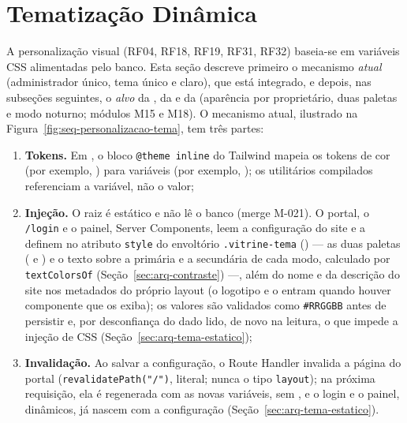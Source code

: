 
\section{Tematização Dinâmica}\label{sec:arq-tema}

A personalização visual (RF04, RF18, RF19, RF31, RF32) baseia-se em variáveis CSS alimentadas pelo banco. Esta seção descreve primeiro o mecanismo \emph{atual} (administrador único, tema único e claro), que está integrado, e depois, nas subseções seguintes, o \emph{alvo} da , da  e da  (aparência por proprietário, duas paletas e modo noturno; módulos M15 e M18). O mecanismo atual, ilustrado na Figura~\ref{fig:seq-personalizacao-tema}, tem três partes:

\begin{enumerate}
  \item \textbf{Tokens.} Em , o bloco \texttt{@theme inline} do Tailwind mapeia os tokens de cor (por exemplo, ) para variáveis (por exemplo, ); os utilitários compilados referenciam a variável, não o valor;
  \item \textbf{Injeção.} O  raiz é estático e não lê o banco (merge M-021). O portal, o \texttt{/login} e o painel, Server Components, leem a configuração do site e a definem no atributo \texttt{style} do envoltório \texttt{.vitrine-tema} () --- as duas paletas ( e ) e o texto sobre a primária e a secundária de cada modo, calculado por \texttt{textColorsOf} (Seção~\ref{sec:arq-contraste}) ---, além do nome e da descrição do site nos metadados do próprio layout (o logotipo e o  entram quando houver componente que os exiba); os valores são validados como \texttt{\#RRGGBB} antes de persistir e, por desconfiança do dado lido, de novo na leitura, o que impede a injeção de CSS (Seção~\ref{sec:arq-tema-estatico});
  \item \textbf{Invalidação.} Ao salvar a configuração, o Route Handler invalida a página do portal (\texttt{revalidatePath("/")}, literal; nunca o tipo \texttt{layout}); na próxima requisição, ela é regenerada com as novas variáveis, sem , e o login e o painel, dinâmicos, já nascem com a configuração (Seção~\ref{sec:arq-tema-estatico}).
\end{enumerate}

